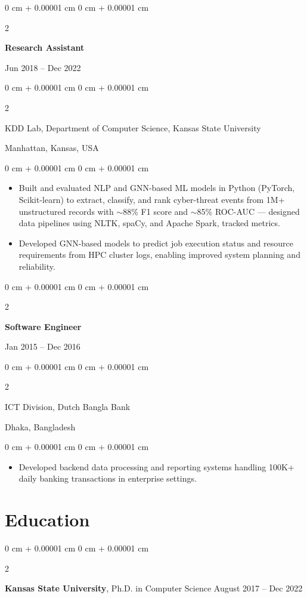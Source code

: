 \documentclass[10pt, letterpaper]{article}
\newenvironment{highlights}{
    \begin{itemize}[
        topsep=0.10 cm,
        parsep=0.10 cm,
        partopsep=0pt,
        itemsep=0pt,
        leftmargin=0 cm + 10pt
    ]
}{
    \end{itemize}
} %
\newenvironment{onecolentry}{
    \begin{adjustwidth}{
        0 cm + 0.00001 cm
    }{
        0 cm + 0.00001 cm
    }
}{
    \end{adjustwidth}
} %
\newenvironment{twocolentry}[2][]{
    \onecolentry
    \def\secondColumn{#2}
    \setcolumnwidth{\fill, 4.5 cm}
    \begin{paracol}{2}
}{
    \switchcolumn \raggedleft \secondColumn
    \end{paracol}
    \endonecolentry
} %
\begin{document}
    \vspace{1mm}

    \begin{twocolentry}{Jun 2018 -- Dec 2022}
        \textbf{Research Assistant}
    \end{twocolentry}
    \begin{twocolentry}{Manhattan, Kansas, USA}
       KDD Lab, Department of Computer Science, Kansas State University
    \end{twocolentry}
    \vspace{0.10 cm}
    \begin{onecolentry}
        \begin{highlights}
            \item Built and evaluated NLP and GNN-based ML models in Python (PyTorch, Scikit-learn) to extract, classify, and rank cyber-threat events from 1M+ unstructured records with $\sim$88\% F1 score and $\sim$85\% ROC-AUC — designed data pipelines using NLTK, spaCy, and Apache Spark, tracked metrics.
            \item Developed GNN-based models to predict job execution status and resource requirements from HPC cluster logs, enabling improved system planning and reliability.
        \end{highlights}
    \end{onecolentry}

    \vspace{0.1 cm}
    \begin{twocolentry}{Jan 2015 -- Dec 2016}
        \textbf{Software Engineer}
    \end{twocolentry}
    \begin{twocolentry}{Dhaka, Bangladesh}
       ICT Division, Dutch Bangla Bank
    \end{twocolentry}

    \begin{onecolentry}
        \begin{highlights}
            \item Developed backend data processing and reporting systems handling 100K+ daily banking transactions in enterprise settings.
        \end{highlights}
    \end{onecolentry}

\section{Education}

        \begin{twocolentry}{
            August 2017 -- Dec 2022
        }
            \textbf{Kansas State University}, Ph.D. in Computer Science\end{twocolentry}
\end{document}
